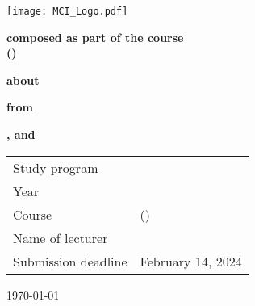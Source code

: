 
\thispagestyle{empty}
\thispdfpagelabel{} %
\begin{center}
	\textbf{\Huge \university}\par
	\vspace{8ex}\par
	\textbf{\LARGE \department}\par
	\vspace{4ex}\par
	\textbf{\Large \studyProgram}\par
	\vspace{4ex}\par
	\texttt{[image: MCI\_Logo.pdf]}\par
	\vspace{4ex}\par
	\textbf{\LARGE \docType}\par
	\vspace{2ex}\par
	\textbf{composed as part of the course\\[0.5ex] \courseName{} (\courseCode)}\par
	\vspace{4ex}\par
	\textbf{about}\par
	\vspace{4ex}\par
	\textbf{\LARGE \docTitle}\par
	\vspace{4ex}\par
	\textbf{from}\par
	\vspace{4ex}\par
	\textbf{\Large \href{\authorAContact}{\authorAName}, \href{\authorBContact}{\authorBName} and \href{\authorContact}{\authorCName}}
\end{center}
\vspace{4ex}
\begin{tabular}{ll}
	Study program & \studyProgram\\[0.5ex]
	Year & \studyYear\\[0.5ex]
	Course & \courseName{} (\courseCode)\\[0.5ex]
   
	Name of lecturer & \href{\lecturerContact}{\lecturerName}\\[0.5ex]
	Submission deadline & February 14, 2024
\end{tabular}
\vfill
\begin{center}
	\today
\end{center}
